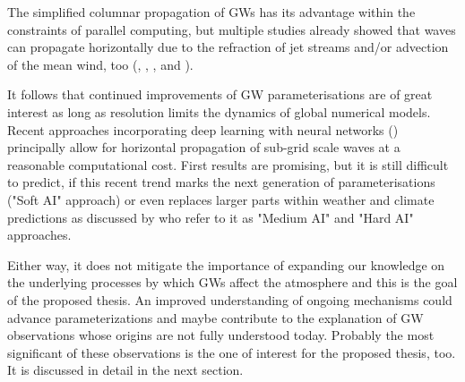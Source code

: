 The simplified columnar propagation of GWs has its advantage within the constraints of parallel computing, but multiple studies already showed that waves can propagate horizontally due to the refraction of jet streams and/or advection of the mean wind, too (\cite{dunkerton_dunkerton_inertiagravity_1984}, \cite{preusse_space-based_2002}, \cite{sato_origins_2009}, \cite{sato_gravity_2012} and \cite{ehard_horizontal_2017}). %

It follows that continued improvements of GW parameterisations are of great interest as long as resolution limits the dynamics of global numerical models. Recent approaches incorporating deep learning with neural networks (\cite{matsuoka_application_2020}) principally allow for horizontal propagation of sub-grid scale waves at a reasonable computational cost. First results are promising, but it is still difficult to predict, if this recent trend marks the next generation of parameterisations ("Soft AI" approach) or even replaces larger parts within weather and climate predictions as discussed by \textcite{chantry_opportunities_2021} who refer to it as "Medium AI" and "Hard AI" approaches.

Either way, it does not mitigate the importance of expanding our knowledge on the underlying processes by which GWs affect the atmosphere and this is the goal of the proposed thesis. An improved understanding of ongoing mechanisms could advance parameterizations and maybe contribute to the explanation of GW observations whose origins are not fully understood today. Probably the most significant of these observations is the one of interest for the proposed thesis, too. It is discussed in detail in the next section.





